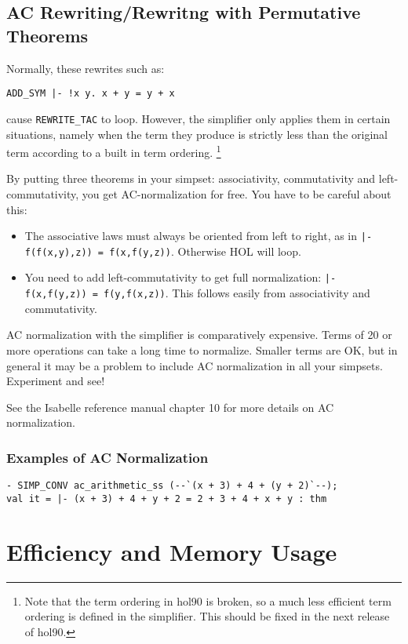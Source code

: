 \section{AC Rewriting/Rewritng with Permutative Theorems}

Normally, these rewrites such as:
\begin{verbatim}
ADD_SYM |- !x y. x + y = y + x
\end{verbatim}
cause {\tt REWRITE\_TAC} to loop.  However, the simplifier only applies
them in certain situations, namely when the term they produce
is strictly less than the original term according to a built in
term ordering.  \footnote{Note that the term ordering in hol90
is broken, so a much less efficient term ordering is defined in
the simplifier.  This should be fixed in the next release of hol90.}

By putting three theorems in your simpset: associativity, commutativity and
left-commutativity, you get AC-normalization for free.  You
have to be careful about this:
\begin{itemize}
   \item The associative laws must always be oriented from left
   to right, as in {\tt |- f(f(x,y),z)) = f(x,f(y,z))}.  Otherwise
   HOL will loop.
   \item You need to add left-commutativity to get full normalization:
   {\tt |- f(x,f(y,z)) = f(y,f(x,z))}.  This follows easily
   from associativity and commutativity.
\end{itemize}

AC normalization with the simplifier is comparatively expensive.
Terms of  20 or more operations can take a long time to
normalize.  Smaller terms are OK, but in general it may be a problem
to include AC normalization in all your simpsets.  Experiment
and see!

See the Isabelle reference manual chapter 10 for more details on
AC normalization.

\subsection{Examples of AC Normalization}

\begin{verbatim}
- SIMP_CONV ac_arithmetic_ss (--`(x + 3) + 4 + (y + 2)`--);
val it = |- (x + 3) + 4 + y + 2 = 2 + 3 + 4 + x + y : thm
\end{verbatim}


\chapter{Efficiency and Memory Usage}

